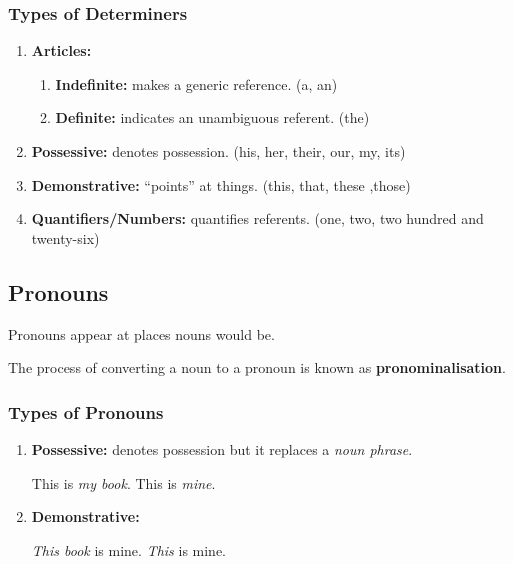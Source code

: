 \documentclass[../main.tex]{subfiles}
\begin{document}
	\subsubsection{Types of Determiners}
	\begin{enumerate}
		\item \textbf{Articles:} \begin{enumerate}
			\item \textbf{Indefinite:} makes a generic reference. (a, an)
			\item \textbf{Definite:} indicates an unambiguous referent. (the)
		\end{enumerate}
		\item \textbf{Possessive:} denotes possession. (his, her, their, our, my, its)
		\item \textbf{Demonstrative:} ``points'' at things. (this, that, these ,those)
		\item \textbf{Quantifiers/Numbers:} quantifies referents. (one, two, two hundred and twenty-six)
	\end{enumerate}

	\subsection{Pronouns}
	Pronouns appear at places nouns would be.
	
	The process of converting a noun to a pronoun is known as \textbf{pronominalisation}.
	
	\subsubsection{Types of Pronouns}
	\begin{enumerate}
		\item \textbf{Possessive:} denotes possession but it replaces a \textit{noun phrase}. \begin{exe}
			\ex \begin{xlist}
				\ex This is \textit{my book}.
				\ex This is \textit{mine}.
			\end{xlist}
		\end{exe}
		\item \textbf{Demonstrative:} 
		\begin{exe}
			\ex \begin{xlist}
				\ex \textit{This book} is mine.
				\ex \textit{This} is mine.
			\end{xlist}
		\end{exe}
	\end{enumerate}
	
\end{document}
